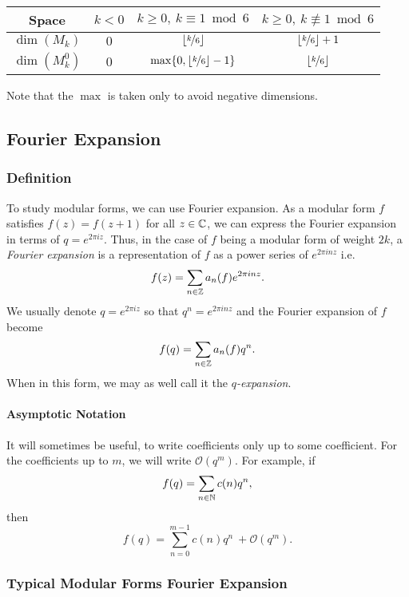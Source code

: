 \begin{center}
\begin{tabular}{||c||c|c|c||} 
    \hline
    Space & $k<0$ & $k \geq 0, \ k \equiv 1 \bmod 6$ & $k \geq 0, \ k \not \equiv 1 \bmod 6$ \\
    \hline
    \hline
    $\dim(M_k)$ & $0$ & $\lfloor \nicefrac{k}{6} \rfloor$ & $\lfloor \nicefrac{k}{6} \rfloor + 1$ \\
    \hline
    $\dim(M_k^0)$ & $0$ & $\max\{0, \lfloor \nicefrac{k}{6} \rfloor - 1\}$ & $\lfloor \nicefrac{k}{6} \rfloor$ \\
    \hline
\end{tabular}
\end{center}
Note that the $\max$ is taken only to avoid negative dimensions.



\subsection{Fourier Expansion}
\subsubsection{Definition}
To study modular forms, we can use Fourier expansion.
As a modular form $f$ satisfies $f(z) = f(z+1)$ for all $z \in \mathbb{C}$, we can express the Fourier expansion in terms of $q = e^{2 \pi i z}$.
Thus, in the case of $f$ being a modular form of weight $2k$, 
a \textit{Fourier expansion} is a representation of $f$ as a power series of $e^{2\pi i n z}$
i.e. $$f(z) = \sum_{n \in \mathbb{Z}} a_n(f) e^{2\pi inz}.$$
We usually denote $q = e^{2\pi i z}$ so that $q^n = e^{2\pi i n z}$ 
and the Fourier expansion of $f$ become 
$$
f(q) = \sum_{n \in \mathbb{Z}} a_n(f) q^n.
$$
When in this form, we may as well call it the \textit{$q$-expansion}.

\paragraph{Asymptotic Notation}
It will sometimes be useful, to write coefficients only up to some coefficient.
For the coefficients up to $m$, we will write $\mathcal{O}(q^m)$.
For example, if 
$$
f(q) = \sum_{n \in \mathbb{N}} c(n) q^n,
$$
then
$$
f(q) = \sum_{n = 0}^{m-1} c(n) q^n \ + \mathcal{O}(q^m).
$$


\subsubsection{Typical Modular Forms Fourier Expansion}
